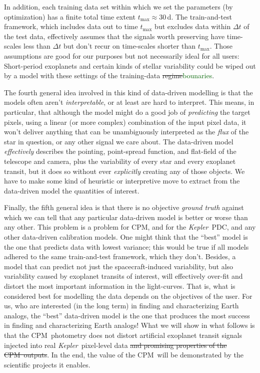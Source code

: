 \documentclass[12pt, preprint]{aastex}
\newcommand{\project}[1]{\textsl{#1}}
\newcommand{\Kepler}{\project{Kepler}}
\newcommand{\name}{CPM}
\newcommand{\revise}[1]{\textcolor{darkgreen}{#1}}
\newcommand{\remove}[1]{\sout{#1}}
\begin{document}
In addition, 
  each training data set within which we set the parameters (by optimization) has a finite total time extent $t_{\max}\approx 30$\,d.
The train-and-test framework, which includes data out to time $t_{\max}$ but excludes data within $\Delta t$ of the test data,
  effectively assumes that the signals worth preserving have time-scales less than $\Delta t$ 
  but don't recur on time-scales shorter than $t_{\max}$.
Those assumptions are good for our purposes but not necessarily ideal for all users:
Short-period exoplanets and certain kinds of stellar variability
  could be wiped out by a model with these settings of the training-data \remove{regime}\revise{bounaries}.

The fourth general idea involved in this kind of data-driven modelling is that the models often aren't \emph{interpretable}, 
  or at least are hard to interpret.
This means, in particular, that although the model might do a good job of \emph{predicting} the target pixels,
  using a linear (or more complex) combination of the input pixel data,
  it won't deliver anything that can be unambiguously interpreted as the \emph{flux} of the star in question,
  or any other signal we care about.
The data-driven model \emph{effectively} describes the pointing, point-spread function, and flat-field
  of the telescope and camera,
  plus the variability of every star and every exoplanet transit,
  but it does so without ever \emph{explicitly} creating any of those objects.
We have to make some kind of heuristic or interpretive move to extract from the data-driven model the quantities of interest.

Finally, the fifth general idea is that there is no objective \emph{ground truth} against which we can tell
  that any particular data-driven model is better or worse than any other.
This problem is a problem for \name, and for the \Kepler\ PDC, and any other data-driven calibration models.
One might think that the ``best'' model is the one that predicts data with lowest variance;
  this would be true if all models adhered to the same train-and-test framework, which they don't.
Besides, a model that can predict not just the spacecraft-induced variability,
  but also variability caused by exoplanet transits of interest,
  will effectively over-fit and distort the most important information in the light-curves.
That is, what is considered best for modelling the data depends on the objectives of the user.
For us, who are interested (in the long term) in finding and characterizing Earth analogs,
  the ``best'' data-driven model is the one that produces the most success in finding and characterizing Earth analogs!
What we will show in what follows is that the \name\ photometry does not distort
  artificial exoplanet transit signals injected into real \Kepler\ pixel-level data
  \remove{and promising properties of the \name\ outputs}.
In the end, the value of the \name\ will be demonstrated by the scientific projects it enables.
\end{document}
